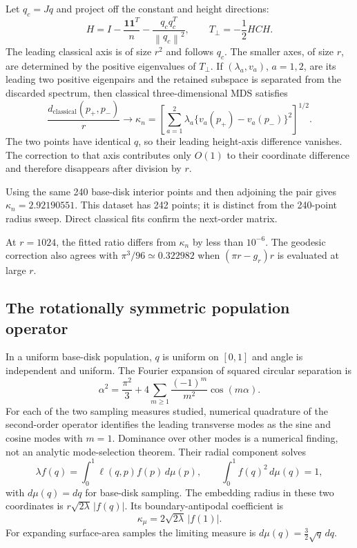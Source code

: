 \documentclass[11pt]{article}
\theoremstyle{remark}\newtheorem{remark}[proposition]{Remark}
\newcommand{\one}{\mathbf 1}
\newcommand{\norm}[1]{\left\lVert#1\right\rVert}
\begin{document}
Let $q_c=Jq$ and project off the constant and height directions:
\begin{equation}
 H=I-\frac{\one\one^T}{n}-\frac{q_cq_c^T}{\norm{q_c}^2},\qquad
 T_{\perp}=-\frac12HCH.
\end{equation}
The leading classical axis is of size $r^2$ and follows $q_c$. The smaller
axes, of size $r$, are determined by the positive eigenvalues of $T_{\perp}$.
If $(\lambda_a,v_a)$, $a=1,2$, are its leading two positive eigenpairs and the
retained subspace is separated from the discarded spectrum, then classical
three-dimensional MDS satisfies
\begin{equation}\label{eq:finite-kappa}
 \frac{d_{\mathrm{classical}}(p_+,p_-)}r\longrightarrow
 \kappa_n=\left[\sum_{a=1}^2\lambda_a
       \{v_a(p_+)-v_a(p_-)\}^2\right]^{1/2}.
\end{equation}
The two points have identical $q$, so their leading height-axis difference
vanishes. The correction to that axis contributes only $O(1)$ to their
coordinate difference and therefore disappears after division by $r$.

Using the same 240 base-disk interior points and then adjoining the pair gives
$\kappa_n=2.92190551$. This dataset has 242 points; it is distinct from the
240-point radius sweep. Direct classical fits confirm the next-order matrix.

At $r=1024$, the fitted ratio differs from $\kappa_n$ by less than $10^{-6}$.
The geodesic correction also agrees with $\pi^3/96\simeq0.322982$ when
$(\pi r-g_r)r$ is evaluated at large $r$.

\subsection{The rotationally symmetric population operator}
In a uniform base-disk population, $q$ is uniform on $[0,1]$ and angle is
independent and uniform. The Fourier expansion of squared circular separation is
\begin{equation}
 \alpha^2=\frac{\pi^2}{3}
       +4\sum_{m\ge1}\frac{(-1)^m}{m^2}\cos(m\alpha).
\end{equation}
For each of the two sampling measures studied, numerical quadrature of the
second-order operator identifies the leading transverse modes as the sine
and cosine modes with $m=1$. Dominance over other modes is a numerical finding,
not an analytic mode-selection theorem. Their radial component solves
\begin{equation}\label{eq:operator}
 \lambda f(q)=\int_0^1\ell(q,p)f(p)\,d\mu(p),\qquad
 \int_0^1 f(q)^2\,d\mu(q)=1,
\end{equation}
with $d\mu(q)=dq$ for base-disk sampling. The embedding radius in these two
coordinates is $r\sqrt{2\lambda}\,|f(q)|$. Its boundary-antipodal coefficient is
\begin{equation}\label{eq:population-kappa}
 \kappa_\mu=2\sqrt{2\lambda}\,|f(1)|.
\end{equation}
For expanding surface-area samples the limiting measure is
$d\mu(q)=\tfrac32\sqrt q\,dq$.
\end{document}
